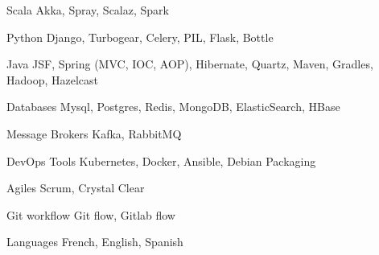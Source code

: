 

\begin{cvskills}

  \cvskill
    {Scala} %
    {Akka, Spray, Scalaz, Spark} %

  \cvskill
    {Python} %
    {Django, Turbogear, Celery, PIL, Flask, Bottle} %


  \cvskill
    {Java} %
    {JSF, Spring (MVC, IOC, AOP), Hibernate, Quartz, Maven, Gradles, Hadoop, Hazelcast} %

  \cvskill
    {Databases} %
    {Mysql, Postgres, Redis, MongoDB, ElasticSearch, HBase} %

  \cvskill
    {Message Brokers} %
    {Kafka, RabbitMQ} %

  \cvskill
    {DevOps Tools} %
    {Kubernetes, Docker, Ansible, Debian Packaging} %

  \cvskill
    {Agiles} %
    {Scrum, Crystal Clear} %

  \cvskill
    {Git workflow} %
    {Git flow, Gitlab flow} %

  \cvskill
    {Languages} %
    {French, English, Spanish} %

\end{cvskills}
